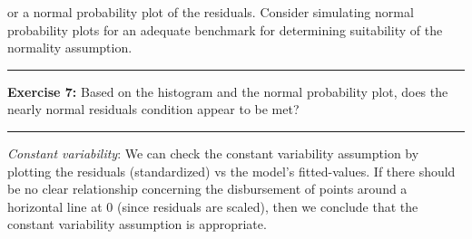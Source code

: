 \documentclass[]{book}
\newenvironment{Shaded}{\begin{snugshade}}{\end{snugshade}}
\newcommand{\KeywordTok}[1]{\textcolor[rgb]{0.13,0.29,0.53}{\textbf{#1}}}
\newcommand{\DataTypeTok}[1]{\textcolor[rgb]{0.13,0.29,0.53}{#1}}
\newcommand{\DecValTok}[1]{\textcolor[rgb]{0.00,0.00,0.81}{#1}}
\newcommand{\StringTok}[1]{\textcolor[rgb]{0.31,0.60,0.02}{#1}}
\newcommand{\CommentTok}[1]{\textcolor[rgb]{0.56,0.35,0.01}{\textit{#1}}}
\newcommand{\OperatorTok}[1]{\textcolor[rgb]{0.81,0.36,0.00}{\textbf{#1}}}
\newcommand{\NormalTok}[1]{#1}
\theoremstyle{definition}
\theoremstyle{definition}
\theoremstyle{definition}
\theoremstyle{remark}
\begin{document}
\begin{Shaded}
\end{Shaded}

or a normal probability plot of the residuals. Consider simulating
normal probability plots for an adequate benchmark for determining
suitability of the normality assumption.

\begin{Shaded}
\end{Shaded}

\begin{center}\rule{0.5\linewidth}{\linethickness}\end{center}

\textbf{Exercise 7:} Based on the histogram and the normal probability
plot, does the nearly normal residuals condition appear to be met?

\begin{center}\rule{0.5\linewidth}{\linethickness}\end{center}

\emph{Constant variability}: We can check the constant variability
assumption by plotting the residuals (standardized) vs the model's
fitted-values. If there should be no clear relationship concerning the
disbursement of points around a horizontal line at 0 (since residuals
are scaled), then we conclude that the constant variability assumption
is appropriate.

\begin{Shaded}
\end{Shaded}
\end{document}
